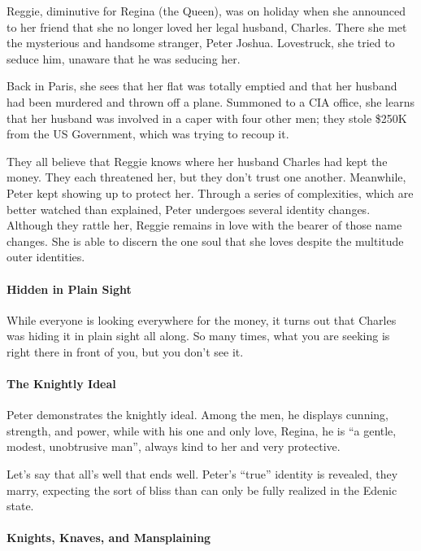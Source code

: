 Reggie, diminutive for Regina (the Queen), was on holiday when she announced to her friend that she no longer loved her legal husband, Charles. There she met the mysterious and handsome stranger, Peter Joshua. Lovestruck, she tried to seduce him, unaware that he was seducing her.

Back in Paris, she sees that her flat was totally emptied and that her husband had been murdered and thrown off a plane. Summoned to a CIA office, she learns that her husband was involved in a caper with four other men; they stole \$250K from the US Government, which was trying to recoup it.

They all believe that Reggie knows where her husband Charles had kept the money. They each threatened her, but they don't trust one another. Meanwhile, Peter kept showing up to protect her. Through a series of complexities, which are better watched than explained, Peter undergoes several identity changes. Although they rattle her, Reggie remains in love with the bearer of those name changes. She is able to discern the one soul that she loves despite the multitude outer identities.

\paragraph{Hidden in Plain Sight}


While everyone is looking everywhere for the money, it turns out that Charles was hiding it in plain sight all along. So many times, what you are seeking is right there in front of you, but you don't see it.

\paragraph{The Knightly Ideal}


Peter demonstrates the knightly ideal. Among the men, he displays cunning, strength, and power, while with his one and only love, Regina, he is ``a gentle, modest, unobtrusive man'', always kind to her and very protective.

Let's say that all's well that ends well. Peter's ``true'' identity is revealed, they marry, expecting the sort of bliss than can only be fully realized in the Edenic state.

\paragraph{Knights, Knaves, and Mansplaining}


